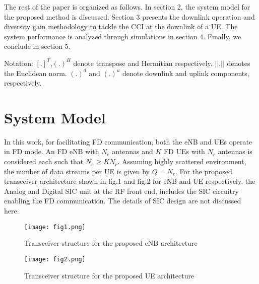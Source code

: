 \documentclass[conference]{IEEEtran}
\begin{document}
    The rest of the paper is organized as follows. In section 2, the system model for the proposed method is discussed. Section 3 presents the downlink operation and diversity gain methodology to tackle the CCI at the downlink of a UE. The system performance is analyzed through simulations in section 4. Finally, we conclude in section 5. \par
    
    Notation: $[.]^T$,$(.)^H$ denote transpose and Hermitian respectively. $||.||$  denotes the Euclidean norm. $(.)^d$ and $(.)^u$ denote downlink and uplink components, respectively. \par
    
\section{System Model}

In this work, for facilitating FD communication, both the eNB and UEs operate in FD mode. An FD eNB with $N_e$ antennas and $K$ FD UEs with $N_r$ antennas is considered each such that $N_e \geq KN_r$. Assuming highly scattered environment, the number of data streams per UE is given by $Q=N_r$. For the proposed transceiver architecture shown in  fig.1 and fig.2 for eNB and UE respectively, the Analog and Digital SIC unit at the RF front end,  includes the SIC circuitry  \cite{full_duplex,compact} enabling the FD communication.  The details of SIC design are not discussed here. \par    

 \begin{figure}
\centering
\texttt{[image: fig1.png]}
\vspace{-0.5em}
   \caption{Transceiver structure for the proposed eNB architecture}
   \label{fone}
\end{figure}

\begin{figure}
\centering
\texttt{[image: fig2.png]}
\vspace{-0.5em}
   \caption{Transceiver structure for the proposed UE architecture}
   \label{ftwo}
   \vspace{-1.5em}
\end{figure}
\end{document}
